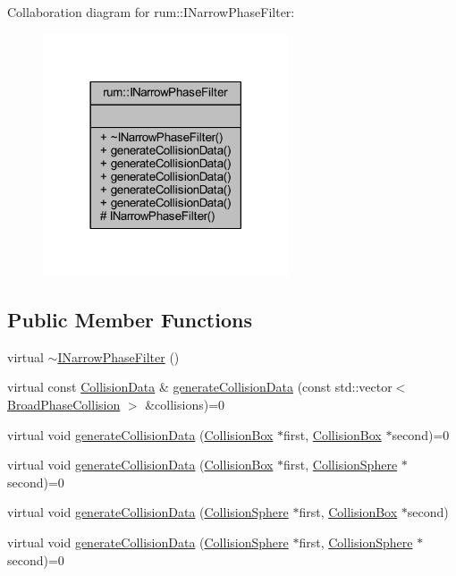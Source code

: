 Collaboration diagram for rum\+:\+:I\+Narrow\+Phase\+Filter\+:\nopagebreak
\begin{figure}[H]
\begin{center}
\leavevmode
\includegraphics[width=206pt]{classrum_1_1_i_narrow_phase_filter__coll__graph}
\end{center}
\end{figure}
\subsection*{Public Member Functions}
\begin{DoxyCompactItemize}
\item 
virtual \mbox{\hyperlink{classrum_1_1_i_narrow_phase_filter_abae7cc1e5a64604912a942c8b41762f1}{$\sim$\+I\+Narrow\+Phase\+Filter}} ()
\item 
virtual const \mbox{\hyperlink{classrum_1_1_collision_data}{Collision\+Data}} \& \mbox{\hyperlink{classrum_1_1_i_narrow_phase_filter_acfce7d2c3d62880920b1ca415f891526}{generate\+Collision\+Data}} (const std\+::vector$<$ \mbox{\hyperlink{structrum_1_1_broad_phase_collision}{Broad\+Phase\+Collision}} $>$ \&collisions)=0
\item 
virtual void \mbox{\hyperlink{classrum_1_1_i_narrow_phase_filter_ade1c61b0bd136086ff27ca34953508c1}{generate\+Collision\+Data}} (\mbox{\hyperlink{classrum_1_1_collision_box}{Collision\+Box}} $\ast$first, \mbox{\hyperlink{classrum_1_1_collision_box}{Collision\+Box}} $\ast$second)=0
\item 
virtual void \mbox{\hyperlink{classrum_1_1_i_narrow_phase_filter_a0f09a3143208893aa12fc9d86c7006e7}{generate\+Collision\+Data}} (\mbox{\hyperlink{classrum_1_1_collision_box}{Collision\+Box}} $\ast$first, \mbox{\hyperlink{classrum_1_1_collision_sphere}{Collision\+Sphere}} $\ast$second)=0
\item 
virtual void \mbox{\hyperlink{classrum_1_1_i_narrow_phase_filter_aaba5f332f2838fe7abfe8e8ee53933fe}{generate\+Collision\+Data}} (\mbox{\hyperlink{classrum_1_1_collision_sphere}{Collision\+Sphere}} $\ast$first, \mbox{\hyperlink{classrum_1_1_collision_box}{Collision\+Box}} $\ast$second)
\item 
virtual void \mbox{\hyperlink{classrum_1_1_i_narrow_phase_filter_a24ed990b049a4912fdebe0dd395d018b}{generate\+Collision\+Data}} (\mbox{\hyperlink{classrum_1_1_collision_sphere}{Collision\+Sphere}} $\ast$first, \mbox{\hyperlink{classrum_1_1_collision_sphere}{Collision\+Sphere}} $\ast$second)=0
\end{DoxyCompactItemize}
